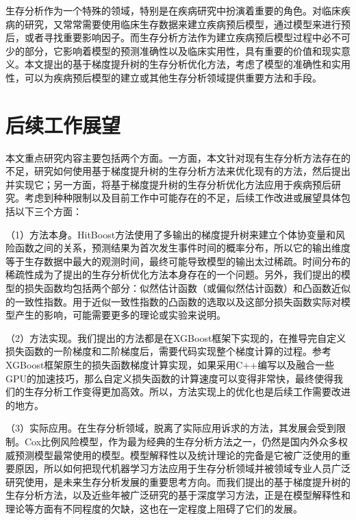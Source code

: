 生存分析作为一个特殊的领域，特别是在疾病研究中扮演着重要的角色。对临床疾病的研究，又常常需要使用临床生存数据来建立疾病预后模型，通过模型来进行预后，或者寻找重要影响因子。而生存分析方法作为建立疾病预后模型过程中必不可少的部分，它影响着模型的预测准确性以及临床实用性，具有重要的价值和现实意义。本文提出的基于梯度提升树的生存分析优化方法，考虑了模型的准确性和实用性，可以为疾病预后模型的建立或其他生存分析领域提供重要方法和手段。

\section{后续工作展望}
本文重点研究内容主要包括两个方面。一方面，本文针对现有生存分析方法存在的不足，研究如何使用基于梯度提升树的生存分析方法来优化现有的方法，然后提出并实现它；另一方面，将基于梯度提升树的生存分析优化方法应用于疾病预后研究。考虑到种种限制以及目前工作中可能存在的不足，后续工作改进或展望具体包括以下三个方面：

（1）方法本身。HitBoost方法使用了多输出的梯度提升树来建立个体协变量和风险函数之间的关系，预测结果为首次发生事件时间的概率分布，所以它的输出维度等于生存数据中最大的观测时间，最终可能导致模型的输出太过稀疏。时间分布的稀疏性成为了提出的生存分析优化方法本身存在的一个问题。另外，我们提出的模型的损失函数均包括两个部分：似然估计函数（或偏似然估计函数）和凸函数近似的一致性指数。用于近似一致性指数的凸函数的选取以及这部分损失函数实际对模型产生的影响，可能需要更多的理论或实验来说明。
    
（2）方法实现。我们提出的方法都是在XGBoost框架下实现的，在推导完自定义损失函数的一阶梯度和二阶梯度后，需要代码实现整个梯度计算的过程。参考XGBoost框架原生的损失函数梯度计算实现，如果采用C++编写以及融合一些GPU的加速技巧，那么自定义损失函数的计算速度可以变得非常快，最终使得我们的生存分析工作变得更加高效。所以，方法实现上的优化也是后续工作需要改进的地方。
    
（3）实际应用。在生存分析领域，脱离了实际应用诉求的方法，其发展会受到限制。Cox比例风险模型，作为最为经典的生存分析方法之一，仍然是国内外众多权威预测模型最常使用的模型。模型解释性以及统计理论的完备是它被广泛使用的重要原因，所以如何把现代机器学习方法应用于生存分析领域并被领域专业人员广泛研究使用，是未来生存分析发展的重要思考方向。而我们提出的基于梯度提升树的生存分析方法，以及近些年被广泛研究的基于深度学习方法，正是在模型解释性和理论等方面有不同程度的欠缺，这也在一定程度上阻碍了它们的发展。
